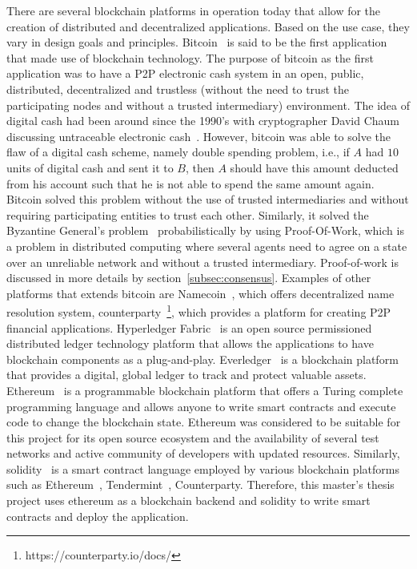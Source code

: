 There are several blockchain platforms in operation today that allow for the
creation of distributed and decentralized applications. Based on the use case,
they vary in design goals and principles. Bitcoin~\cite{Bitcoin_Satoshi} is
said to be the first application that made use of blockchain technology. The
purpose of bitcoin as the first application was to have a P2P electronic cash
system in an open, public, distributed, decentralized and trustless (without
the need to trust the participating nodes and without a trusted intermediary)
environment. The idea of digital cash had been around since the 1990's with
cryptographer David Chaum discussing untraceable electronic
cash~\cite{chaum1988untraceable}. However, bitcoin was able to solve the flaw
of a digital cash scheme, namely double spending problem, i.e., if $A$ had $10$
units of digital cash and sent it to $B$, then $A$ should have this amount
deducted from his account such that he is not able to spend the same amount
again. Bitcoin solved this problem without the use of trusted intermediaries
and without requiring participating entities to trust each other. Similarly, it
solved the Byzantine General's
problem~\cite{lamport1982byzantine,miller2014anonymous} probabilistically by
using Proof-Of-Work, which is a problem in distributed computing where several
agents need to agree on a state over an unreliable network and without a
trusted intermediary. Proof-of-work is discussed in more details by
section~\ref{subsec:consensus}. Examples of other platforms that extends
bitcoin are Namecoin~\cite{kalodner2015empirical}, which offers decentralized
name resolution system, counterparty~\footnote{https://counterparty.io/docs/},
which provides a platform for creating P2P financial applications. Hyperledger
Fabric~\cite{cachin2016architecture} is an open source permissioned distributed
ledger technology platform that allows the applications to have blockchain
components as a plug-and-play.  Everledger~\cite{lomas2015everledger} is a
blockchain platform that provides a digital, global ledger to track and protect
valuable assets. Ethereum~\cite{wood2014ethereum} is a programmable blockchain
platform that offers a Turing complete programming language and allows anyone
to write smart contracts and execute code to change the blockchain state.
Ethereum was considered to be suitable for this project for its open source
ecosystem and the availability of several test networks and active community of
developers with updated resources. Similarly, solidity~\cite{SolidityDocs} is a
smart contract language employed by various blockchain platforms such as
Ethereum~\cite{wood2014ethereum}, Tendermint~\cite{TendermintDocs},
Counterparty. Therefore, this master's thesis project uses ethereum as a
blockchain backend and solidity to write smart contracts and deploy the
application.  



